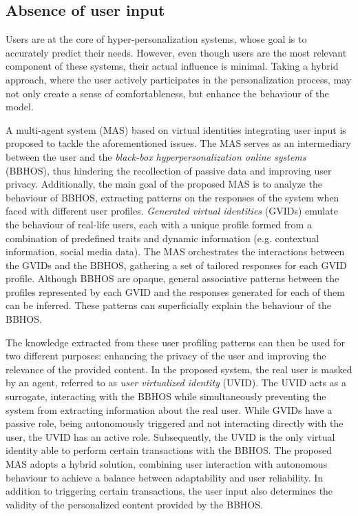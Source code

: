 \subsection*{Absence of user input}
Users are at the core of hyper-personalization systems, whose goal is to accurately predict their needs. However, even though users are the most relevant component of these systems, their actual influence is minimal. Taking a hybrid approach, where the user actively participates in the personalization process, may not only create a sense of comfortableness, but enhance the behaviour of the model.

A multi-agent system (MAS) based on virtual identities integrating user input is proposed to tackle the aforementioned issues. The MAS serves as an intermediary between the user and the \textit{black-box hyperpersonalization online systems} (BBHOS), thus hindering the recollection of passive data and improving user privacy. Additionally, the main goal of the proposed MAS is to analyze the behaviour of BBHOS, extracting patterns on the responses of the system when faced with different user profiles. \textit{Generated virtual identities} (GVIDs) emulate the behaviour of real-life users, each with a unique profile formed from a combination of predefined traits and dynamic information (e.g. contextual information, social media data). The MAS orchestrates the interactions between the GVIDs and the BBHOS, gathering a set of tailored responses for each GVID profile. Although BBHOS are opaque, general associative patterns between the profiles represented by each GVID and the responses generated for each of them can be inferred. These patterns can superficially explain the behaviour of the BBHOS.

The knowledge extracted from these user profiling patterns can then be used for two different purposes: enhancing the privacy of the user and improving the relevance of the provided content. In the proposed system, the real user is masked by an agent, referred to as \textit{user virtualized identity} (UVID). The UVID acts as a surrogate, interacting with the BBHOS while simultaneously preventing the system from extracting information about the real user. While GVIDs have a passive role, being autonomously triggered and not interacting directly with the user, the UVID has an active role. Subsequently, the UVID is the only virtual identity able to perform certain transactions with the BBHOS. The proposed MAS adopts a hybrid solution, combining user interaction with autonomous behaviour to achieve a balance between adaptability and user reliability. In addition to triggering certain transactions, the user input also determines the validity of the personalized content provided by the BBHOS.


